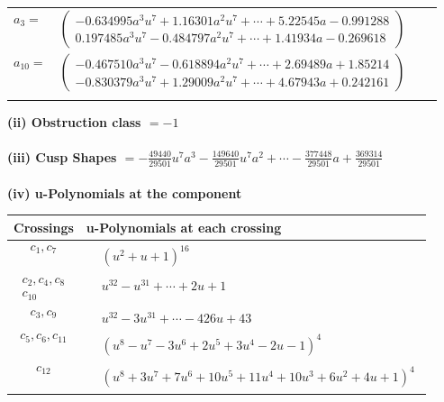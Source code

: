 \documentclass[1p]{elsarticle_modified}
\theoremstyle{definition}
\begin{document}
\begin{tabular}{m{7pt} m{180pt} m{7pt} m{180pt} }
\flushright $a_{3}=$&$\begin{pmatrix}-0.634995 a^{3} u^{7}+1.16301 a^{2} u^{7}+\cdots+5.22545 a-0.991288\\0.197485 a^{3} u^{7}-0.484797 a^{2} u^{7}+\cdots+1.41934 a-0.269618\end{pmatrix}$ \\
\flushright $a_{10}=$&$\begin{pmatrix}-0.467510 a^{3} u^{7}-0.618894 a^{2} u^{7}+\cdots+2.69489 a+1.85214\\-0.830379 a^{3} u^{7}+1.29009 a^{2} u^{7}+\cdots+4.67943 a+0.242161\end{pmatrix}$\\&\end{tabular}
\flushleft \textbf{(ii) Obstruction class $= -1$}\\~\\
\flushleft \textbf{(iii) Cusp Shapes $= -\frac{49440}{29501} u^7 a^3-\frac{149640}{29501} u^7 a^2+\cdots-\frac{377448}{29501} a+\frac{369314}{29501}$}\\~\\
\newpage\renewcommand{\arraystretch}{1}
\flushleft \textbf{(iv) u-Polynomials at the component}\newline \\
\begin{tabular}{m{50pt}|m{274pt}}
Crossings & \hspace{64pt}u-Polynomials at each crossing \\
\hline $$\begin{aligned}c_{1},c_{7}\end{aligned}$$&$\begin{aligned}
&(u^2+u+1)^{16}
\end{aligned}$\\
\hline $$\begin{aligned}c_{2},c_{4},c_{8}\\c_{10}\end{aligned}$$&$\begin{aligned}
&u^{32}- u^{31}+\cdots+2 u+1
\end{aligned}$\\
\hline $$\begin{aligned}c_{3},c_{9}\end{aligned}$$&$\begin{aligned}
&u^{32}-3 u^{31}+\cdots-426 u+43
\end{aligned}$\\
\hline $$\begin{aligned}c_{5},c_{6},c_{11}\end{aligned}$$&$\begin{aligned}
&(u^8- u^7-3 u^6+2 u^5+3 u^4-2 u-1)^4
\end{aligned}$\\
\hline $$\begin{aligned}c_{12}\end{aligned}$$&$\begin{aligned}
&(u^8+3 u^7+7 u^6+10 u^5+11 u^4+10 u^3+6 u^2+4 u+1)^4
\end{aligned}$\\
\hline
\end{tabular}\\~\\
\end{document}
